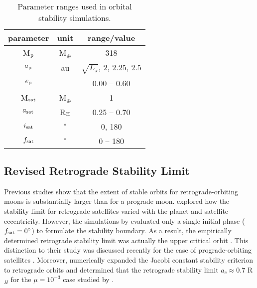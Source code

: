 \documentclass[preprint]{aastex63}
\begin{document}
\begin{table}
	\centering
	\caption{Parameter ranges used in orbital stability simulations.}
	\label{tab:param_rng}
	\begin{tabular}{ccc} %
		\hline
		 parameter & unit &  range/value\\
		\hline
		M$_{\rm p}$ & M$_\oplus$ & 318 \\
		$a_{\rm p}$& au & $\sqrt{L_\star}$, 2, 2.25, 2.5\\
		$e_{\rm p}$&  & 0.00 -- 0.60 \\
		M$_{\rm sat}$ & M$_\oplus$ & 1 \\
		$a_{\rm sat}$ & R$_{\rm H}$ & 0.25 -- 0.70\\
		$i_{\rm sat}$ & $^\circ$ & 0, 180 \\
		$f_{\rm sat}$ & $^\circ$ & 0 -- 180 \\
		\hline
	\end{tabular}
\end{table}

\subsection{Revised Retrograde Stability Limit}\label{sec:revised}
Previous studies \citep{Henon1970,Innanen1979,Hamilton1991,Domingos2006} show that the extent of stable orbits for retrograde-orbiting moons is substantially larger than for a prograde moon.  \cite{Domingos2006} explored how the stability limit for retrograde satellites varied with the planet and satellite eccentricity.  However, the simulations by \citeauthor{Domingos2006} evaluated only a single initial phase ($f_{\rm sat} = 0^\circ$) to formulate the stability boundary.  As a result, the empirically determined retrograde stability limit was actually the upper critical orbit \citep{Dvorak1986}.  This distinction to their study was discussed recently for the case of prograde-orbiting satellites \citep{Rosario-Franco2020}.  Moreover, \cite{Quarles2020} numerically expanded the Jacobi constant stability criterion \citep{Eberle2008} to retrograde orbits and determined that the retrograde stability limit $a_c \approx 0.7$ R$_H$ for the $\mu = 10^{-3}$ case studied by \cite{Domingos2006}.  
\end{document}
